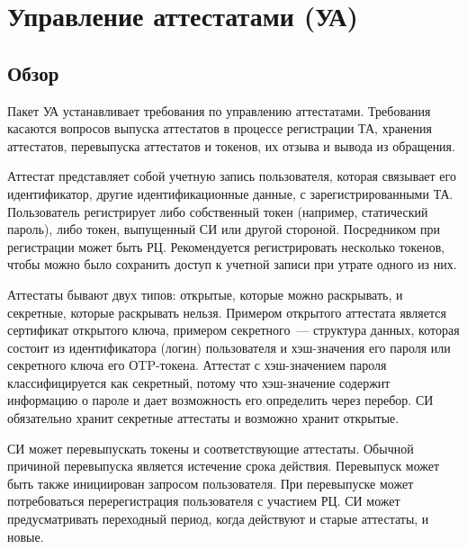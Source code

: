 \section{Управление аттестатами (УА)}\label{CM}

\subsection{Обзор}\label{CM.Intro}

Пакет УА устанавливает требования по управлению аттестатами.
Требования касаются вопросов выпуска аттестатов в процессе регистрации ТА,
хранения аттестатов, перевыпуска аттестатов и токенов, их отзыва и вывода из
обращения.

Аттестат представляет собой учетную запись пользователя, которая связывает
его идентификатор, другие идентификационные данные, с зарегистрированными ТА.
%
Пользователь регистрирует либо собственный токен (например, статический пароль), 
либо токен, выпущенный СИ или другой стороной. 
%
Посредником при регистрации может быть РЦ. Рекомендуется регистрировать 
несколько токенов, чтобы можно было сохранить доступ к учетной записи при 
утрате одного из них.


Аттестаты бывают двух типов: открытые, которые можно раскрывать, и 
секретные, которые раскрывать нельзя. 
%
Примером открытого аттестата является сертификат открытого ключа, примером 
секретного~--- структура данных, которая состоит из идентификатора 
(логин) пользователя и хэш-значения его пароля или секретного ключа его 
ОTP-токена.
%
Аттестат с хэш-значением пароля классифицируется как секретный, потому что 
хэш-значение содержит информацию о пароле и дает возможность его определить
через перебор.
%
СИ обязательно хранит секретные аттестаты и возможно хранит открытые.

%

СИ может перевыпускать токены и соответствующие аттестаты. Обычной причиной
перевыпуска является истечение срока действия. Перевыпуск может быть также
инициирован запросом пользователя. При перевыпуске может потребоваться
перерегистрация пользователя с участием РЦ. СИ может предусматривать переходный
период, когда действуют и старые аттестаты, и новые.

